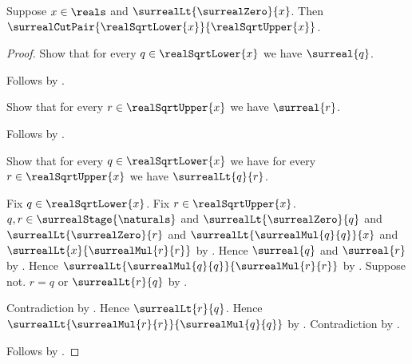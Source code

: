 \begin{proposition}\label{surreal_real_sqrt_cut_pair}
    Suppose $x\in\reals$ and
        $\surrealLt{\surrealZero}{x}$.
    Then $\surrealCutPair{\realSqrtLower{x}}{\realSqrtUpper{x}}$.
\end{proposition}
\begin{proof}
    Show that for every $q\in\realSqrtLower{x}$ we have
        $\surreal{q}$.
    \begin{subproof}
        Follows by
            .
    \end{subproof}
    Show that for every $r\in\realSqrtUpper{x}$ we have
        $\surreal{r}$.
    \begin{subproof}
        Follows by
            .
    \end{subproof}
    Show that for every $q\in\realSqrtLower{x}$ we have
        for every $r\in\realSqrtUpper{x}$ we have
            $\surrealLt{q}{r}$.
    \begin{subproof}
        Fix $q\in\realSqrtLower{x}$.
        Fix $r\in\realSqrtUpper{x}$.
        $q,r\in\surrealStage{\naturals}$ and
            $\surrealLt{\surrealZero}{q}$ and
            $\surrealLt{\surrealZero}{r}$ and
            $\surrealLt{\surrealMul{q}{q}}{x}$ and
            $\surrealLt{x}{\surrealMul{r}{r}}$
            by
            .
        Hence $\surreal{q}$ and $\surreal{r}$
            by
            .
        Hence
            $\surrealLt{\surrealMul{q}{q}}
                {\surrealMul{r}{r}}$
            by
            .
        Suppose not.
        $r=q$ or $\surrealLt{r}{q}$
            by .
        \begin{byCase}
                Contradiction by
                    .
                Hence $\surrealLt{r}{q}$.
                Hence
                    $\surrealLt{\surrealMul{r}{r}}
                        {\surrealMul{q}{q}}$
                    by
                    .
                Contradiction by
                    .
        \end{byCase}
    \end{subproof}
    Follows by .
\end{proof}

